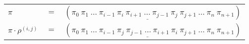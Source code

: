 \begin{example}\label{example:COJXWMAC}
  \hfill
  \begin{\position}
    \begin{tabular}{lll}
      $\pi$ & $=$ & $(\pi_0~\pi_1~\dots~\pi_{i-1}~\underline{\pi_{i}~\pi_{i+1}~\dots~\pi_{j-1}~\pi_{j}}~\pi_{j+1}~\dots~\pi_{n}~\pi_{n+1})$ \\
      $\pi \cdot \rho^{(i,j)}$ & $=$ & $(\pi_0~\pi_1~\dots~\pi_{i-1}~\underline{\pi_{j}~\pi_{j-1}~\dots~\pi_{i+1}~\pi_{i}}~\pi_{j+1}~\dots~\pi_{n}~\pi_{n+1})$ \\
    \end{tabular}
  \end{\position}
\end{example}